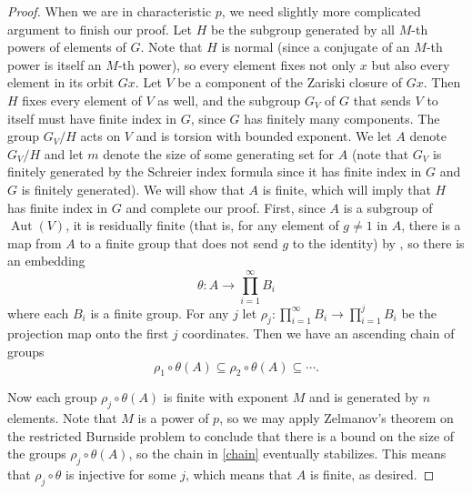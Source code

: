 \documentclass{amsart}
\newcommand{\lra}{\longrightarrow}
\DeclareMathOperator{\Aut}{Aut}
\theoremstyle{definition}
\begin{document}
\begin{proof}
  When we are in characteristic $p$, we need slightly more complicated
  argument to finish our proof.  Let $H$ be the subgroup generated by
  all $M$-th powers of elements of $G$.  Note that $H$ is normal
  (since a conjugate of an $M$-th power is itself an $M$-th power), so
  every element fixes not only $x$ but also every element in its orbit
  $Gx$. Let $V$ be a component of the Zariski closure of $Gx$.  Then
  $H$ fixes every element of $V$ as well, and the subgroup $G_V$ of
  $G$ that sends $V$ to itself must have finite index in $G$, since
  $G$ has finitely many components.  The group $G_V/H$ acts on $V$ and
  is torsion with bounded exponent.  We let $A$ denote $G_V/H$ and let
  $m$ denote the size of some generating set for $A$ (note that $G_V$
  is finitely generated by the Schreier index formula since it has
  finite index in $G$ and $G$ is finitely generated).  We will show
  that $A$ is finite, which will imply that $H$ has finite index in
  $G$ and complete our proof.  First, since $A$ is a subgroup of
  $\Aut(V)$, it is residually finite (that is, for any element of
  $g \not= 1$ in $A$, there is a map from $A$ to a finite group that
  does not send $g$ to the identity) by \cite[Theorem 1.1]{Bass2}, so
  there is an embedding
  \[ \theta: A \lra \prod_{i=1}^\infty B_i \]
  where each $B_i$ is a finite group.  For any $j$ let $\rho_j: \prod_{i=1}^\infty B_i
\lra  \prod_{i=1}^j B_i$ be the projection map onto the first $j$
coordinates.  Then we have an ascending chain of groups
\begin{equation}\label{chain}
\rho_1\circ\theta (A) \subseteq \rho_2\circ \theta(A) \subseteq
\cdots. 
\end{equation}

Now each group $\rho_j \circ \theta(A)$ is finite with
exponent $M$ and is generated by $n$ elements. Note that $M$ is a
power of $p$, so we may apply Zelmanov's theorem \cite{Z1,Z2} on the restricted
Burnside problem to conclude that there is a bound on the size of the
groups $\rho_j \circ \theta(A)$, so the chain in \eqref{chain}
eventually stabilizes.  This means that $\rho_j\circ
\theta$ is injective for some $j$, which means that $A$ is finite, as
desired. 
  
 


\end{proof}
\end{document}
